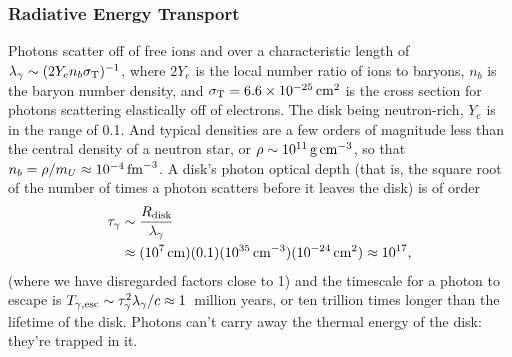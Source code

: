 \subsubsection{Radiative Energy Transport}
\label{sssc:nu_E_transport}
Photons scatter off of free ions and over a characteristic length of
$\lambda_\gamma\sim(2Y_e n_b\sigma_{\rm T})^{-1}$, where $2Y_e$ is the local
number ratio of ions to baryons, $n_b$ is the baryon number density, and
$\sigma_{\rm T}=6.6\times10^{-25}\,{\rm cm}^2$ is the cross section
for photons scattering elastically off of electrons. The disk being
neutron-rich, $Y_e$ is in the range of 0.1. And typical densities are a
few orders of magnitude less than the central density of a neutron star,
or $\rho\sim10^{11}\,{\rm g\,cm}^{-3}$,
so that $n_b=\rho/m_U\approx10^{-4}\,{\rm fm}^{-3}$.
A disk's photon optical depth (that is, the square root of the number of times
a photon scatters before it leaves the disk) is of order
\begin{align}
  \tau_\gamma &\sim \frac{R_{\rm disk}}{\lambda_\gamma} \nonumber \\
  &\approx (10^7\,{\rm cm})(0.1)(10^{35}\,{\rm cm}^{-3})(10^{-24}\,{\rm cm}^2)
  \approx 10^{17}, \nonumber
\end{align}
(where we have disregarded factors close to 1)
and the timescale for a photon to escape is
$T_{\gamma,\rm esc}\sim\tau_\gamma^2\lambda_\gamma/c\approx1$~million years, or
ten trillion times longer than the lifetime of the disk.
Photons can't carry away the thermal energy of the disk: they're trapped in it.

